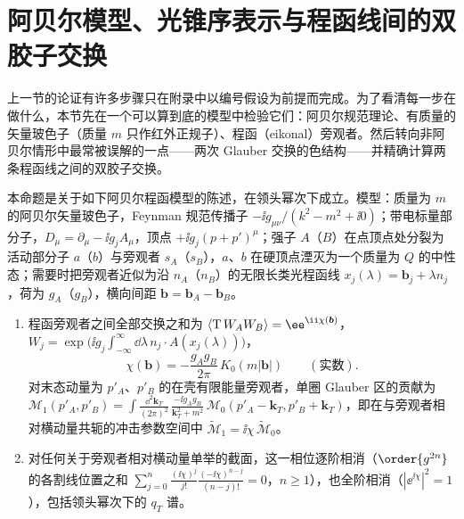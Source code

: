 \section{阿贝尔模型、光锥序表示与程函线间的双胶子交换}\label{sec:dy-model}

上一节的论证有许多步骤只在附录中以编号假设为前提而完成。为了看清每一步在做什么，本节先在一个可以算到底的模型中检验它们：阿贝尔规范理论、有质量的矢量玻色子（质量 $m$ 只作红外正规子）、程函（eikonal）旁观者。然后转向非阿贝尔情形中最常被误解的一点——两次 Glauber 交换的色结构——并精确计算两条程函线之间的双胶子交换。

\begin{proposition}\label{prop:dy-abelian-model}
本命题是关于如下阿贝尔程函模型的陈述，在领头幂次下成立。模型：质量为 $m$ 的阿贝尔矢量玻色子，Feynman 规范传播子 $-\ii g_{\mu\nu}/(k^2-m^2+\ii0)$；带电标量部分子，$D_\mu=\partial_\mu-\ii g_jA_\mu$，顶点 $+\ii g_j(p+p')^\mu$；强子 $A$（$B$）在点顶点处分裂为活动部分子 $a$（$b$）与旁观者 $s_A$（$s_B$），$a$、$b$ 在硬顶点湮灭为一个质量为 $Q$ 的中性态；需要时把旁观者近似为沿 $n_A$（$n_B$）的无限长类光程函线 $x_j(\lambda)=\boldsymbol b_j+\lambda n_j$，荷为 $g_A$（$g_B$），横向间距 $\boldsymbol b=\boldsymbol b_A-\boldsymbol b_B$。
\begin{enumerate}[label=(G-\roman*),leftmargin=3em,itemsep=1pt,topsep=2pt]
\item 程函旁观者之间全部交换之和为 $\langle{\rm T}\,W_AW_B\rangle=\ee^{\ii\chi(\boldsymbol b)}$，$W_j=\exp\big(\ii g_j\int_{-\infty}^\infty\dd\lambda\,n_j\cdot A(x_j(\lambda))\big)$，
\begin{equation}\label{eq:dy-chi}
\chi(\boldsymbol b)=-\frac{g_Ag_B}{2\pi}\,K_0(m|\boldsymbol b|)\qquad(\text{实数}).
\end{equation}
对末态动量为 $p'_A$、$p'_B$ 的在壳有限能量旁观者，单圈 Glauber 区的贡献为
$\mathcal M_1(p'_A,p'_B)=\int\frac{\dd^2\mathbf k_T}{(2\pi)^2}\,\frac{-\ii g_Ag_B}{\mathbf k_T^2+m^2}\,\mathcal M_0(p'_A-\mathbf k_T,p'_B+\mathbf k_T)$，即在与旁观者相对横动量共轭的冲击参数空间中 $\tilde{\mathcal M}_1=\ii\chi\,\tilde{\mathcal M}_0$。
\item 对任何关于旁观者相对横动量单举的截面，这一相位逐阶相消（$\order{g^{2n}}$ 的各割线位置之和 $\sum_{j=0}^n\frac{(\ii\chi)^j}{j!}\frac{(-\ii\chi)^{n-j}}{(n-j)!}=0$，$n\ge1$），也全阶相消（$|\ee^{\ii\chi}|^2=1$），包括领头幂次下的 $q_T$ 谱。

\end{enumerate}
\end{proposition}

